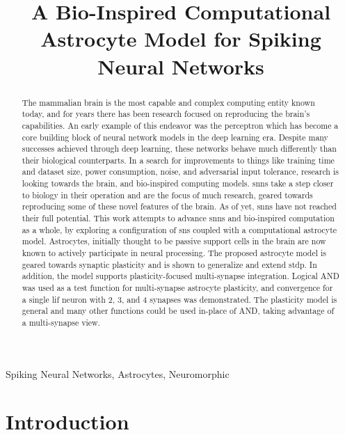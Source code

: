\documentclass[conference]{IEEEtran}
\title{A Bio-Inspired Computational Astrocyte Model for Spiking Neural Networks}
\begin{document}
\maketitle

\begin{abstract}
The mammalian brain is the most capable and complex computing entity known
today, and for years there has been research focused on reproducing the brain's
capabilities. An early example of this endeavor was the perceptron which has
become a core building block of neural network models in the deep learning
era. Despite many successes achieved through deep learning, these networks
behave much differently than their biological counterparts. In a search for
improvements to things like training time and dataset size, power consumption,
noise, and adversarial input tolerance, research is looking towards the brain,
and bio-inspired computing models. \Glspl{snn} take a step closer to biology in
their operation and are the focus of much research, geared towards reproducing
some of these novel features of the brain. As of yet, \glspl{snn} have not reached
their full potential. This work attempts to advance \glspl{snn} and bio-inspired
computation as a whole, by exploring a configuration of \glspl{sn} coupled with
a computational astrocyte model. Astrocytes, initially thought to be passive
support cells in the brain are now known to actively participate in neural
processing. The proposed astrocyte model is geared towards synaptic plasticity
and is shown to generalize and extend \gls{stdp}. In addition, the model
supports plasticity-focused multi-synapse integration. Logical AND was used as a
test function for multi-synapse astrocyte plasticity, and convergence for a
single \gls{lif} neuron with 2, 3, and 4 synapses was demonstrated. The
plasticity model is general and many other functions could be used in-place of
AND, taking advantage of a multi-synapse view.

\end{abstract}

\begin{IEEEkeywords}
Spiking Neural Networks, Astrocytes, Neuromorphic
\end{IEEEkeywords}

\section{Introduction}
\end{document}
